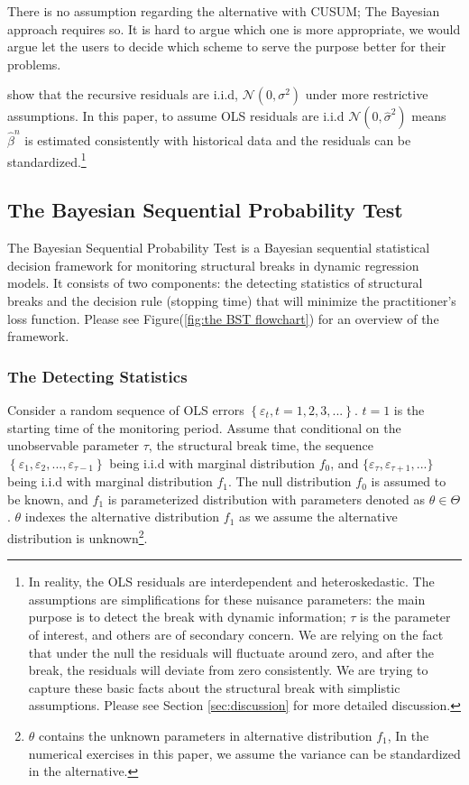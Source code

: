 \documentclass[preprint,authoryear,12pt,english]{elsarticle}
\theoremstyle{plain}
\begin{document}
There is no assumption regarding the alternative with CUSUM; The Bayesian approach requires so. It is hard to argue which one is more appropriate, we would argue let the users to decide which scheme to serve the purpose better for their problems.

\cite{Brown1975TechniquesTime} show that the recursive residuals are i.i.d, $\mathcal{N}(0,\sigma^{2})$ under more restrictive assumptions. In this paper, to assume OLS residuals are i.i.d $\mathcal{N}(0,\hat{\sigma}^{2})$ means $\hat{\beta}^{n}$ is estimated consistently with historical data and the residuals can be standardized.\footnote{In reality, the OLS residuals are interdependent and heteroskedastic. The assumptions are simplifications for these nuisance parameters: the main purpose is to detect the break with dynamic information; $\tau$ is the parameter of interest, and others are of secondary concern. We are relying on the fact that under the null the residuals will fluctuate around zero, and after the break, the residuals will deviate from zero consistently. We are trying to capture these basic facts about the structural break with simplistic assumptions. Please see Section {\ref{sec:discussion}} for more detailed discussion.}

\subsection{The Bayesian Sequential Probability Test}
The Bayesian Sequential Probability Test is a Bayesian sequential statistical decision framework for monitoring structural breaks in dynamic regression models. It consists of two components: the detecting statistics of structural breaks and the decision rule (stopping time) that will minimize the practitioner's loss function. Please see Figure(\ref{fig:the BST flowchart}) for an overview of the framework.

\subsubsection{The Detecting Statistics}
Consider a random sequence of OLS errors $\left\{\varepsilon_{t}, t=1,2,3,... \right\}$. $t=1$ is the starting time of the monitoring period. Assume that conditional on the unobservable parameter $\tau$, the structural break time, the sequence $\left\{\varepsilon_{1},\varepsilon_{2},...,\varepsilon_{\tau-1} \right\}$ being i.i.d with marginal distribution $f_{0}$, and $\{\varepsilon_{\tau},\varepsilon_{\tau+1},...\}$ being i.i.d with marginal distribution $f_{1}$. The null distribution $f_{0}$ is assumed to be known, and $f_{1}$ is parameterized distribution with parameters denoted as $\theta \in \Theta$. $\theta$ indexes the alternative distribution $f_{1}$ as we assume the alternative distribution is unknown\footnote{$\theta$ contains the unknown parameters in alternative distribution $f_{1}$, In the numerical exercises in this paper, we assume the variance can be standardized in the alternative.}.
\end{document}
